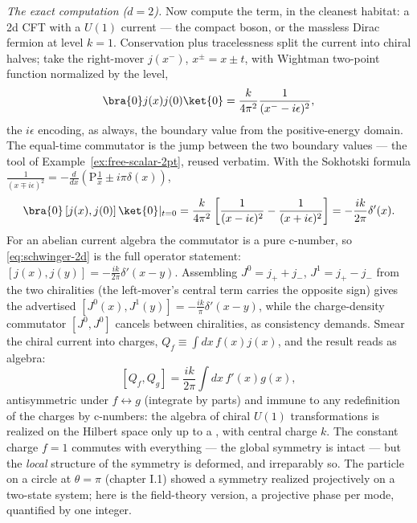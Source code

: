 \begin{eexample}
\emph{The exact computation ($d = 2$).} Now compute the term, in the cleanest
habitat: a 2d CFT with a $U(1)$ current --- the compact boson, or the
massless Dirac fermion at level $k = 1$. Conservation plus tracelessness
split the current into chiral halves; take the right-mover $j(x^-)$, $x^\pm =
x \pm t$, with Wightman two-point function normalized by the level,
\begin{equation}
\bra{0} j(x) j(0) \ket{0}
= \frac{k}{4\pi^2}\frac{1}{(x^- - i\epsilon)^2},
\label{eq:jj-2d}
\end{equation}
the $i\epsilon$ encoding, as always, the boundary value from the
positive-energy domain. The equal-time commutator is the jump between the two
boundary values --- the tool of Example~\ref{ex:free-scalar-2pt}, reused
verbatim. With the Sokhotski formula $\frac{1}{(x \mp i\epsilon)^2} = -
\frac{d}{dx}\left(\mathrm{P}\frac1x \pm i\pi\delta(x)\right)$,
\begin{equation}
\bra{0}\left[j(x),j(0)\right]\ket{0}|_{t=0}
= \frac{k}{4\pi^2}\left[\frac{1}{(x-i\epsilon)^2} -
\frac{1}{(x+i\epsilon)^2}\right]
= -\frac{i k}{2\pi}\delta'(x).
\label{eq:schwinger-2d}
\end{equation}
For an abelian current algebra the commutator is a pure c-number, so
\eqref{eq:schwinger-2d} is the full operator statement: $[j(x), j(y)] =
-\frac{ik}{2\pi}\delta'(x-y)$. Assembling $J^0 = j_+ + j_-$, $J^1 = j_+ -
j_-$ from the two chiralities (the left-mover's central term carries the
opposite sign) gives the advertised $[J^0(x), J^1(y)] = -\frac{ik}{\pi}
\delta'(x - y)$, while the charge-density commutator $[J^0, J^0]$ cancels
between chiralities, as consistency demands. Smear the chiral current into
charges, $Q_f \equiv \int dx\, f(x) j(x)$, and the result reads as algebra:
\begin{equation}
\left[ Q_f , Q_g \right] = \frac{ik}{2\pi} \int dx\, f'(x) g(x),
\label{eq:central-extension}
\end{equation}
antisymmetric under $f \leftrightarrow g$ (integrate by parts) and immune to
any redefinition of the charges by c-numbers: the algebra of chiral $U(1)$
transformations is realized on the Hilbert space only up to a , with central charge $k$. The constant charge $f = 1$ commutes
with everything --- the global symmetry is intact --- but the
\emph{local} structure of the symmetry is deformed, and irreparably so. The
particle on a circle at $\theta = \pi$ (chapter I.1) showed a symmetry
realized projectively on a two-state system; here is the field-theory
version, a projective phase per mode, quantified by one integer.


\end{eexample}
